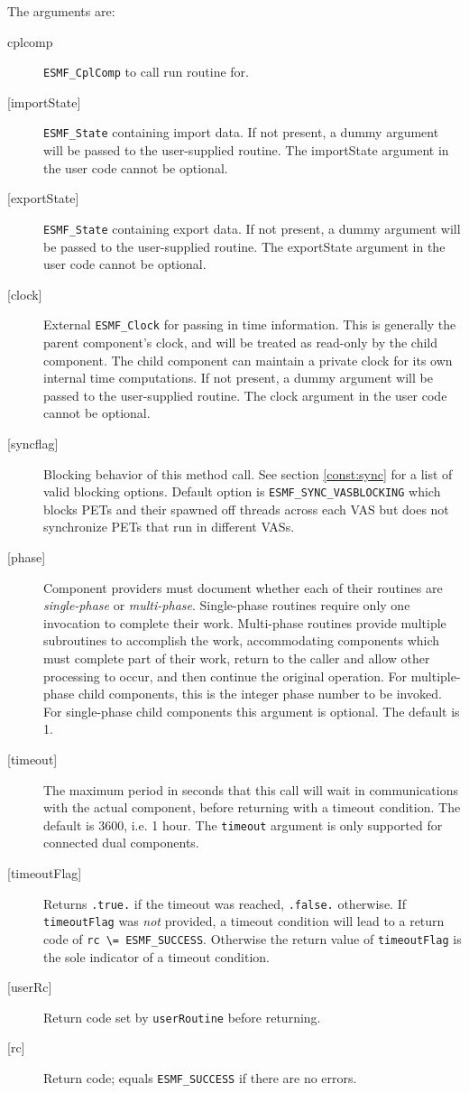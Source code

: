    The arguments are:
   \begin{description}
   \item[cplcomp]
     {\tt ESMF\_CplComp} to call run routine for.
   \item[{[importState]}]
     {\tt ESMF\_State} containing import data. If not present, a dummy
     argument will be passed to the user-supplied routine.  The
     importState argument in the user code cannot be optional.
   \item[{[exportState]}]
     {\tt ESMF\_State} containing export data. If not present, a dummy
     argument will be passed to the user-supplied routine.  The
     exportState argument in the user code cannot be optional.
   \item[{[clock]}]
     External {\tt ESMF\_Clock} for passing in time information.
     This is generally the parent component's clock, and will be treated
     as read-only by the child component.  The child component can maintain
     a private clock for its own internal time computations. If not present, a dummy
     argument will be passed to the user-supplied routine.  The
     clock argument in the user code cannot be optional.
   \item[{[syncflag]}]
     Blocking behavior of this method call. See section \ref{const:sync}
     for a list of valid blocking options. Default option is
     {\tt ESMF\_SYNC\_VASBLOCKING} which blocks PETs and their spawned off threads
     across each VAS but does not synchronize PETs that run in different VASs.
   \item[{[phase]}]
     Component providers must document whether each of their
     routines are {\em single-phase} or {\em multi-phase}.
     Single-phase routines require only one invocation to complete
     their work.
     Multi-phase routines provide multiple subroutines to accomplish
     the work, accommodating components which must complete part of their
     work, return to the caller and allow other processing to occur,
     and then continue the original operation.
     For multiple-phase child components, this is the integer phase
     number to be invoked.
     For single-phase child components this argument is optional. The default is
     1.
   \item[{[timeout]}]
     The maximum period in seconds that this call will wait in communications
     with the actual component, before returning with a timeout condition.
     The default is 3600, i.e. 1 hour. The {\tt timeout} argument is only
     supported for connected dual components.
   \item[{[timeoutFlag]}]
     Returns {\tt .true.} if the timeout was reached, {\tt .false.} otherwise.
     If {\tt timeoutFlag} was {\em not} provided, a timeout condition will lead
     to a return code of {\tt rc \textbackslash = ESMF\_SUCCESS}. Otherwise the
     return value of {\tt timeoutFlag} is the sole indicator of a timeout
     condition.
   \item[{[userRc]}]
     Return code set by {\tt userRoutine} before returning.
   \item[{[rc]}]
     Return code; equals {\tt ESMF\_SUCCESS} if there are no errors.
   \end{description}
  
\setlength{\parskip}{\oldparskip}
\setlength{\parindent}{\oldparindent}
\setlength{\baselineskip}{\oldbaselineskip}
